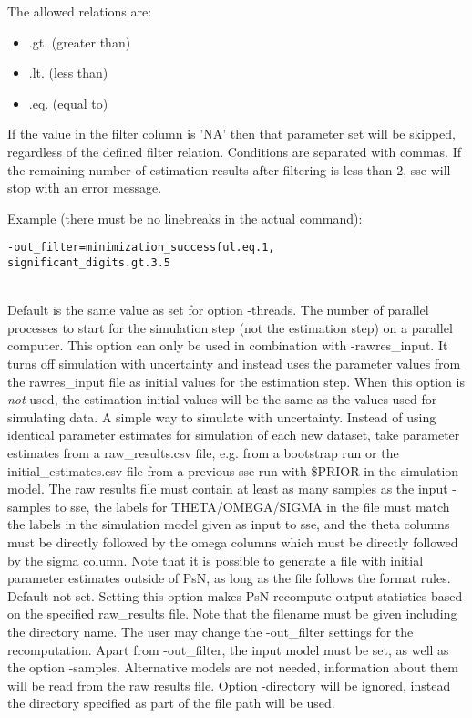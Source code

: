\begin{optionlist}
The allowed relations are:
\begin{itemize}
	\item .gt. (greater than)
	\item .lt. (less than)
	\item .eq. (equal to)
\end{itemize}
If the value in the filter column is 'NA' then that parameter set will be skipped, regardless of the defined filter relation. Conditions are separated with commas. If the remaining number of estimation results after filtering is less than 2, sse will stop with an error message.

Example (there must be no linebreaks in the actual command):
\begin{verbatim}
-out_filter=minimization_successful.eq.1,
significant_digits.gt.3.5
\end{verbatim} \\
\nextopt
{}
Default is the same value as set for option -threads. The number of parallel processes to start for the simulation step (not the estimation step) on a parallel computer. 
\nextopt
{}
This option can only be used in combination with -rawres\_input. It turns off simulation with uncertainty and instead uses the parameter values from the rawres\_input file as initial values for the estimation step. When this option is \emph{not} used, the estimation initial values will be the same as the values used for simulating data.
\nextopt
{}
A simple way to simulate with uncertainty. Instead of using identical parameter estimates for simulation of each new dataset, take parameter estimates from a raw\_results.csv file, e.g. from a bootstrap run or the initial\_estimates.csv file from a previous sse run with \$PRIOR in the simulation model. The raw results file must contain at least as many samples as the input -samples to sse, the labels for THETA/OMEGA/SIGMA in the file must match the labels in the simulation model given as input to sse, and the theta columns must be directly followed by the omega columns which must be directly followed by the sigma column. Note that it is possible to generate a file with initial parameter estimates outside of PsN, as long as the file follows the format rules. 
\nextopt
{}
Default not set. Setting this option makes PsN recompute output statistics based on the specified raw\_results file. Note that the filename must be given including the directory name. The user may change the -out\_filter settings for the recomputation. Apart from -out\_filter, the input model must be set, as well as the option -samples. Alternative models are not needed, information about them will be read from the raw results file. Option -directory will be ignored, instead the directory specified as part of the file path will be used.

\end{optionlist}
